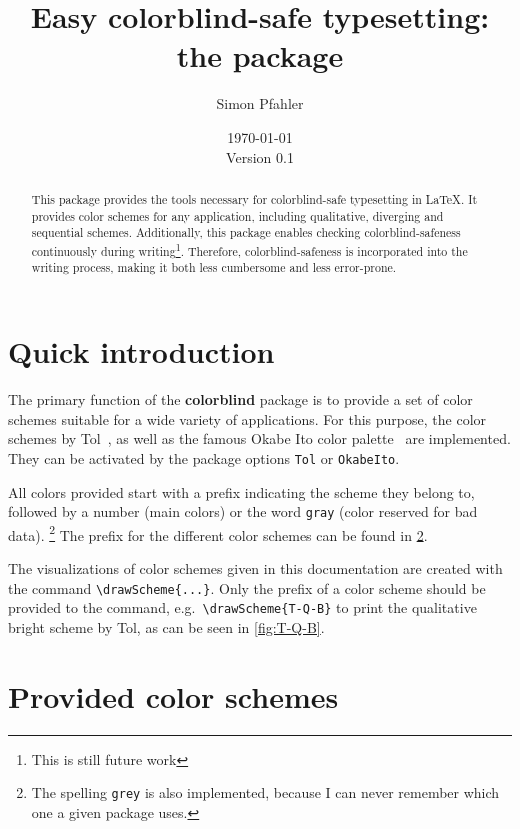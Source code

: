 \documentclass{article}
\title{Easy colorblind-safe typesetting:\\ the \colorblind package}
\author{Simon Pfahler}
\date{\today\\Version 0.1}
\newcommand\colorblind{\textbf{colorblind} }
\newcommand\marg[1]{\leavevmode\marginpar{\raggedleft #1}}
\begin{document}
\maketitle

\begin{abstract}
    This package provides the tools necessary for colorblind-safe typesetting in \LaTeX.
    It provides color schemes for any application, including qualitative, diverging and sequential schemes.
    Additionally, this package enables checking colorblind-safeness continuously during writing\footnote{This is still future work}.
    Therefore, colorblind-safeness is incorporated into the writing process, making it both less cumbersome and less error-prone.
\end{abstract}

\tableofcontents

\section{Quick introduction}
\cprotect\marg{\verb!Tol!\\\verb!OkabeIto!}%
The primary function of the \colorblind package is to provide a set of color schemes suitable for a wide variety of applications.
For this purpose, the color schemes by Tol~\cite{Tol}, as well as the famous Okabe Ito color palette~\cite{Ichihara_2008} are implemented.
They can be activated by the package options \verb!Tol! or \verb!OkabeIto!.

All colors provided start with a prefix indicating the scheme they belong to, followed by a number (main colors) or the word \verb!gray! (color reserved for bad data).%
\cprotect\footnote{%
    The spelling \verb!grey! is also implemented, because I can never remember which one a given package uses.
}
The prefix for the different color schemes can be found in \cref{sec:colors}.

\cprotect\marg{\verb!\drawScheme{...}!}%
The visualizations of color schemes given in this documentation are created with the command \verb!\drawScheme{...}!.
Only the prefix of a color scheme should be provided to the command, e.g.\ \verb!\drawScheme{T-Q-B}! to print the qualitative bright scheme by Tol, as can be seen in \cref{fig:T-Q-B}.


\section{Provided color schemes}\label{sec:colors}
\end{document}
